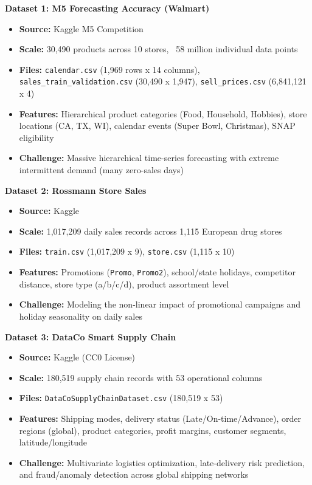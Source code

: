 \documentclass[12pt, a4paper]{report}
\begin{document}
\textbf{Dataset 1: M5 Forecasting Accuracy (Walmart)}
\begin{itemize}
\item \textbf{Source:} Kaggle M5 Competition
\item \textbf{Scale:} 30,490 products across 10 stores, ~58 million individual data points
\item \textbf{Files:} \texttt{calendar.csv} (1,969 rows x 14 columns), \texttt{sales\_train\_validation.csv} (30,490 x 1,947), \texttt{sell\_prices.csv} (6,841,121 x 4)
\item \textbf{Features:} Hierarchical product categories (Food, Household, Hobbies), store locations (CA, TX, WI), calendar events (Super Bowl, Christmas), SNAP eligibility
\item \textbf{Challenge:} Massive hierarchical time-series forecasting with extreme intermittent demand (many zero-sales days)
\end{itemize}

\textbf{Dataset 2: Rossmann Store Sales}
\begin{itemize}
\item \textbf{Source:} Kaggle
\item \textbf{Scale:} 1,017,209 daily sales records across 1,115 European drug stores
\item \textbf{Files:} \texttt{train.csv} (1,017,209 x 9), \texttt{store.csv} (1,115 x 10)
\item \textbf{Features:} Promotions (\texttt{Promo}, \texttt{Promo2}), school/state holidays, competitor distance, store type (a/b/c/d), product assortment level
\item \textbf{Challenge:} Modeling the non-linear impact of promotional campaigns and holiday seasonality on daily sales
\end{itemize}

\textbf{Dataset 3: DataCo Smart Supply Chain}
\begin{itemize}
\item \textbf{Source:} Kaggle (CC0 License)
\item \textbf{Scale:} 180,519 supply chain records with 53 operational columns
\item \textbf{Files:} \texttt{DataCoSupplyChainDataset.csv} (180,519 x 53)
\item \textbf{Features:} Shipping modes, delivery status (Late/On-time/Advance), order regions (global), product categories, profit margins, customer segments, latitude/longitude
\item \textbf{Challenge:} Multivariate logistics optimization, late-delivery risk prediction, and fraud/anomaly detection across global shipping networks
\end{itemize}
\end{document}

